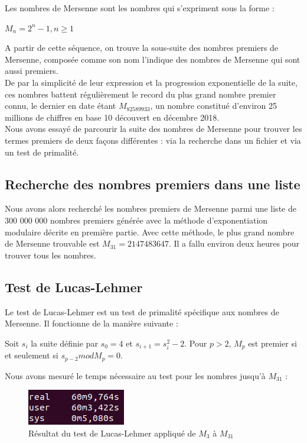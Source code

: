 Les nombres de Mersenne sont les nombres qui s'expriment sous la forme :

\begin{center}
$M_{n} = 2^{n}-1, n\geq1$
\end{center}

A partir de cette séquence, on trouve la sous-suite des nombres premiers de Mersenne, composée comme son nom l'indique des nombres de Mersenne qui sont aussi premiers.\\
De par la simplicité de leur expression et la progression exponentielle de la suite, ces nombres battent régulièrement le record du plus grand nombre premier connu, le dernier en date étant $M_{82 589 933}$, un nombre constitué d'environ 25 millions de chiffres en base 10 découvert en décembre 2018.\\
Nous avons essayé de parcourir la suite des nombres de Mersenne pour trouver les termes premiers de deux façons différentes : via la recherche dans un fichier et via un test de primalité.

\subsection{Recherche des nombres premiers dans une liste}
Nous avons alors recherché les nombres premiers de Mersenne parmi une liste de 300 000 000 nombres premiers générée avec la méthode d'exponentiation modulaire décrite en première partie.
Avec cette méthode, le plus grand nombre de Mersenne trouvable est $M_{31}=2 147 483 647$.
Il a fallu environ deux heures pour trouver tous les nombres.

\subsection{Test de Lucas-Lehmer}
Le test de Lucas-Lehmer est un test de primalité spécifique aux nombres de Mersenne. Il fonctionne de la manière suivante :

Soit $s_{i}$ la suite définie par $s_{0}=4$ et $s_{i+1}=s_{i}^{2}-2$.
Pour $p>2$, $M_{p}$ est premier si et seulement si $s_{p-2} mod M_{p} = 0$.

Nous avons mesuré le temps nécessaire au test pour les nombres jusqu'à $M_{31}$ :
\begin{figure}[!h]
\begin{center}
\includegraphics[scale=0.5]{images/benchmark_lucas.png}
\end{center}
\caption{Résultat du test de Lucas-Lehmer appliqué de $M_{3}$ à $M_{31}$}
\end{figure}

